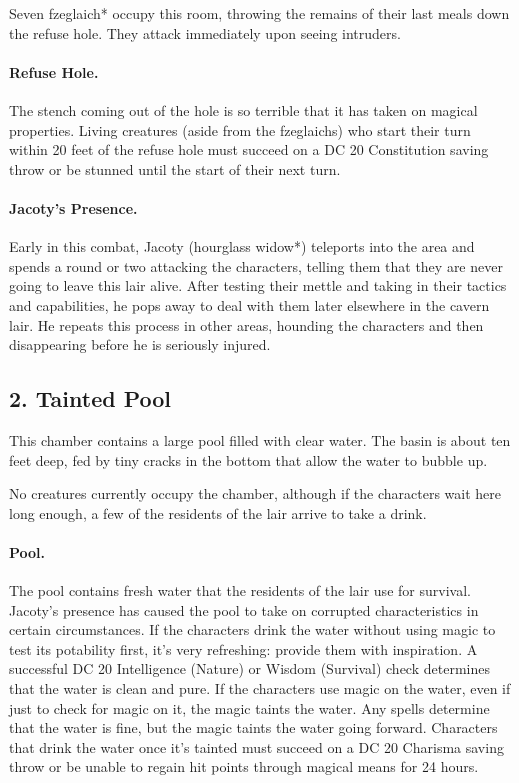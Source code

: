\documentclass[10pt,a4paper,twoside,twocolumn,openany,bg=print,nodeprecatedcode]{dndbook}
\begin{document}
Seven fzeglaich* occupy this room, throwing the remains of their last meals down the refuse hole. They attack immediately upon seeing intruders.
\paragraph{Refuse Hole.}
The stench coming out of the hole is so terrible that it has taken on magical properties. Living creatures (aside from the fzeglaichs) who start their turn within 20 feet of the refuse hole must succeed on a DC 20 Constitution saving throw or be stunned until the start of their next turn.
\paragraph{Jacoty's Presence.}
Early in this combat, Jacoty (hourglass widow*) teleports into the area and spends a round or two attacking the characters, telling them that they are never going to leave this lair alive. After testing their mettle and taking in their tactics and capabilities, he pops away to deal with them later elsewhere in the cavern lair. He repeats this process in other areas, hounding the characters and then disappearing before he is seriously injured.
\subsection{2. Tainted Pool}
\begin{DndReadAloud}{}
This chamber contains a large pool filled with clear water. The basin is about ten feet deep, fed by tiny cracks in the bottom that allow the water to bubble up.
\end{DndReadAloud}

No creatures currently occupy the chamber, although if the characters wait here long enough, a few of the residents of the lair arrive to take a drink.
\paragraph{Pool.}
The pool contains fresh water that the residents of the lair use for survival. Jacoty's presence has caused the pool to take on corrupted characteristics in certain circumstances.
If the characters drink the water without using magic to test its potability first, it's very refreshing: provide them with inspiration. A successful DC 20 Intelligence (Nature) or Wisdom (Survival) check determines that the water is clean and pure.
If the characters use magic on the water, even if just to check for magic on it, the magic taints the water. Any spells determine that the water is fine, but the magic taints the water going forward. Characters that drink the water once it's tainted must succeed on a DC 20 Charisma saving throw or be unable to regain hit points through magical means for 24 hours.
\end{document}
